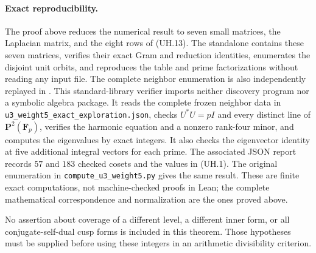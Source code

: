 \paragraph{Exact reproducibility.}
The proof above reduces the numerical result to seven small matrices,
the Laplacian matrix, and the eight rows of (UH.13).  The standalone
 contains these
seven matrices, verifies their exact Gram and reduction identities,
enumerates the disjoint unit orbits, and reproduces the table and
prime factorizations without reading any input file.  The complete
neighbor enumeration is also independently replayed in
.
This standard-library verifier imports neither discovery program nor
a symbolic algebra package.  It reads the complete frozen neighbor
data in \texttt{u3\_weight5\_exact\_exploration.json}, checks $U^*U=pI$
and every distinct line of $\mathbf P^2(\mathbf F_p)$, verifies the
harmonic equation and a nonzero rank-four minor, and computes the
eigenvalues by exact integers.  It also checks the eigenvector identity
at five additional integral vectors for each prime.  The associated
JSON report records $57$ and $183$ checked cosets and the values in
(UH.1).  The original enumeration in \texttt{compute\_u3\_weight5.py}
gives the same result.  These are finite exact computations, not
machine-checked proofs in Lean; the complete mathematical correspondence
and normalization are the ones proved above.

No assertion about coverage of a different level, a different inner
form, or all conjugate-self-dual cusp forms is included in this theorem.
Those hypotheses must be supplied before using these integers in an
arithmetic divisibility criterion.
